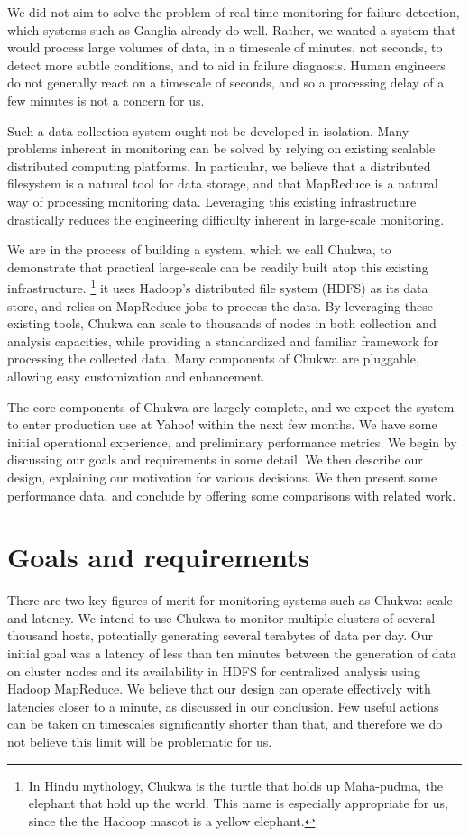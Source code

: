 \documentclass[letterpaper,twocolumn,10pt]{article}
\begin{document}
We did not aim to solve the problem of real-time monitoring for failure detection, which systems such as Ganglia already do well. Rather, we wanted a system that would process large volumes of data, in a timescale of minutes, not seconds, to detect more subtle conditions, and to aid in failure diagnosis. Human engineers do not generally react on a timescale of seconds, and so a processing delay of a few minutes is not a concern for us.

Such a data collection system ought not be developed in isolation. Many problems inherent in monitoring can be solved by relying on existing scalable distributed computing platforms. In particular, we believe that a distributed filesystem is a natural tool for data storage, and that MapReduce is a natural way of processing monitoring data. Leveraging this existing infrastructure drastically reduces the engineering difficulty inherent in large-scale monitoring.
 
 We are in the process of building a system, which we call Chukwa, to demonstrate that practical large-scale can be readily built atop this existing infrastructure. \footnote{In Hindu mythology, Chukwa is the turtle that holds up Maha-pudma, the elephant that hold up the world.  This name is especially appropriate for us, since the the Hadoop mascot is a yellow elephant.}   
 it uses Hadoop's distributed file system (HDFS) as its data store, and relies on MapReduce jobs to process the data. By leveraging these existing tools, Chukwa can scale to thousands of nodes in both collection and analysis capacities, while providing a standardized and familiar framework  for processing the collected data. Many components of Chukwa are pluggable, allowing easy customization and enhancement.
 
The core components of Chukwa are largely complete, and we expect the system to enter production use at Yahoo! within the next few months. We have some initial operational experience, and preliminary performance metrics.    We begin by discussing our goals and requirements in some detail.  We then describe our design, explaining our motivation for various decisions. We then present some performance data, and conclude by offering some comparisons with related work.

\section{Goals and requirements} 


There are two key figures of merit for monitoring systems such as Chukwa: scale and latency.  We intend to use Chukwa to monitor multiple clusters of several thousand hosts, potentially generating several terabytes of data per day.  Our initial goal was a latency of less than ten minutes between the generation of data on cluster nodes and its availability in HDFS for centralized analysis using Hadoop MapReduce. We believe that our design can operate effectively with latencies closer to a minute, as discussed in our conclusion.  Few useful actions can be taken on timescales significantly shorter than that, and therefore we do not believe this limit will be problematic for us.%
\end{document}
